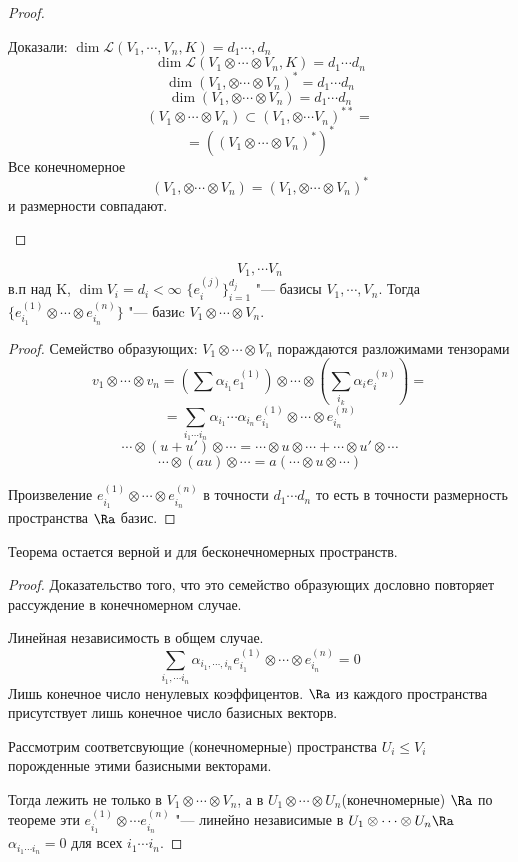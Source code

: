 \begin{proof}
\begin{enumerate}
    Доказали: $\dim \mathcal{L}(V_1, \cdots, V_n, K) = d_1 \cdots, d_n$
    $$\dim \mathcal{L}(V_1 \otimes \cdots \otimes V_n, K) = d_1 \cdots d_n$$
    $$\dim (V_1, \otimes \cdots \otimes V_n)^* = d_1 \cdots d_n$$
    $$\dim (V_1, \otimes \cdots \otimes V_n) = d_1 \cdots d_n$$
    $$(V_1 \otimes \cdots \otimes V_n) \subset (V_1, \otimes \cdots V_n)^{**} = $$
    $$= ((V_1 \otimes \cdots \otimes V_n)^*)^*$$
    Все конечномерное 
    $$(V_1, \otimes \cdots \otimes V_n) = (V_1, \otimes \cdots \otimes V_n)^*$$
    и размерности совпадают. 
    \end{enumerate}
\end{proof}

\begin{theorem}
$$V_1, \cdots V_n$$ в.п над K, $\dim V_i = d_i < \infty$
$\{e_{i}^{(j)}\}_{i = 1}^{d_j}$ "--- базисы $V_1, \cdots, V_n$.
Тогда $\{e_{i_1}^{(1)} \otimes \cdots \otimes e_{i_n}^{(n)}\}$ "--- базиc $V_1 \otimes \cdots \otimes V_n$.
\end{theorem}
\begin{proof}
    Семейство образующих:
    $V_1 \otimes \cdots \otimes V_n$ пораждаются разложимами тензорами 
    $$v_1 \otimes \cdots \otimes v_n = (\sum \alpha_{i_1} e_1^{(1)}) \otimes \cdots \otimes (\sum_{i_k}\alpha_ie_i^{(n)}) =$$
    $$= \sum_{i_1 \cdots i_n}\alpha_{i_1} \cdots \alpha_{i_n} e_{i_1}^{(1)} \otimes\cdots \otimes e_{i_n}^{(n)}$$
    $$\cdots \otimes (u + u') \otimes \cdots = \cdots \otimes u \otimes \cdots + \cdots \otimes u' \otimes \cdots$$
    $$\cdots \otimes (au) \otimes \cdots = a(\cdots \otimes u \otimes \cdots) $$

    Произвеление $e_{i_1}^{(1)} \otimes \cdots \otimes e_{i_n}^{(n)}$ в точности $d_1 \cdots d_n$ то есть 
    в точности размерность пространства $\Ra$ базис. 
\end{proof}
\begin{Rem}
Теорема остается верной и для бесконечномерных пространств. 
\end{Rem}
\begin{proof}
    Доказательство того, что это семейство образующих дословно повторяет рассуждение в конечномерном случае. 

    Линейная независимость в общем случае. 
    $$\sum_{i_1,  \cdots i_n}\alpha_{i_1,\cdots, i_n}e_{i_1}^{(1)} \otimes \cdots \otimes e_{i_n}^{(n)} = 0$$
    Лишь конечное число ненулевых коэффицентов. 
    $\Ra$ из каждого пространства присутствует лишь конечное число базисных векторв. 

    Рассмотрим соответсвующие (конечномерные) пространства $U_i \le V_i$ порожденные этими базисными векторами. 

    Тогда лежить не только в $V_1 \otimes \cdots \otimes V_n$, а в $U_1 \otimes \cdots \otimes U_n$(конечномерные)
    $\Ra$ по теореме эти $e_{i_1}^{(1)} \otimes \cdots e_{i_n}^{(n)}$ "--- линейно независимые в $U_1 \otimes \cdots \otimes U_n \Ra$
    $\alpha_{i_1 \cdots i_n} = 0$ для всех $i_1 \cdots i_n$. 
\end{proof}

